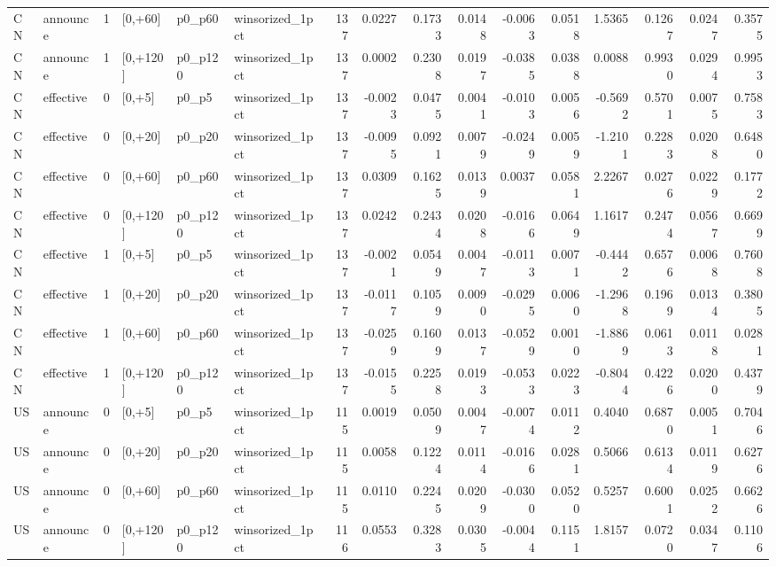 \begin{tabular}{llrlllrrrrrrrrrr}
CN & announce & 1 & [0,+60] & p0_p60 & winsorized_1pct & 137 & 0.0227 & 0.1733 & 0.0148 & -0.0063 & 0.0518 & 1.5365 & 0.1267 & 0.0247 & 0.3575 \\
CN & announce & 1 & [0,+120] & p0_p120 & winsorized_1pct & 137 & 0.0002 & 0.2308 & 0.0197 & -0.0385 & 0.0388 & 0.0088 & 0.9930 & 0.0294 & 0.9953 \\
CN & effective & 0 & [0,+5] & p0_p5 & winsorized_1pct & 137 & -0.0023 & 0.0475 & 0.0041 & -0.0103 & 0.0056 & -0.5692 & 0.5701 & 0.0075 & 0.7583 \\
CN & effective & 0 & [0,+20] & p0_p20 & winsorized_1pct & 137 & -0.0095 & 0.0921 & 0.0079 & -0.0249 & 0.0059 & -1.2101 & 0.2283 & 0.0208 & 0.6480 \\
CN & effective & 0 & [0,+60] & p0_p60 & winsorized_1pct & 137 & 0.0309 & 0.1625 & 0.0139 & 0.0037 & 0.0581 & 2.2267 & 0.0276 & 0.0229 & 0.1772 \\
CN & effective & 0 & [0,+120] & p0_p120 & winsorized_1pct & 137 & 0.0242 & 0.2434 & 0.0208 & -0.0166 & 0.0649 & 1.1617 & 0.2474 & 0.0567 & 0.6699 \\
CN & effective & 1 & [0,+5] & p0_p5 & winsorized_1pct & 137 & -0.0021 & 0.0549 & 0.0047 & -0.0113 & 0.0071 & -0.4442 & 0.6576 & 0.0068 & 0.7608 \\
CN & effective & 1 & [0,+20] & p0_p20 & winsorized_1pct & 137 & -0.0117 & 0.1059 & 0.0090 & -0.0295 & 0.0060 & -1.2968 & 0.1969 & 0.0134 & 0.3805 \\
CN & effective & 1 & [0,+60] & p0_p60 & winsorized_1pct & 137 & -0.0259 & 0.1609 & 0.0137 & -0.0529 & 0.0010 & -1.8869 & 0.0613 & 0.0118 & 0.0281 \\
CN & effective & 1 & [0,+120] & p0_p120 & winsorized_1pct & 137 & -0.0155 & 0.2258 & 0.0193 & -0.0533 & 0.0223 & -0.8044 & 0.4226 & 0.0200 & 0.4379 \\
US & announce & 0 & [0,+5] & p0_p5 & winsorized_1pct & 115 & 0.0019 & 0.0509 & 0.0047 & -0.0074 & 0.0112 & 0.4040 & 0.6870 & 0.0051 & 0.7046 \\
US & announce & 0 & [0,+20] & p0_p20 & winsorized_1pct & 115 & 0.0058 & 0.1224 & 0.0114 & -0.0166 & 0.0281 & 0.5066 & 0.6134 & 0.0119 & 0.6276 \\
US & announce & 0 & [0,+60] & p0_p60 & winsorized_1pct & 115 & 0.0110 & 0.2245 & 0.0209 & -0.0300 & 0.0520 & 0.5257 & 0.6001 & 0.0252 & 0.6626 \\
US & announce & 0 & [0,+120] & p0_p120 & winsorized_1pct & 116 & 0.0553 & 0.3283 & 0.0305 & -0.0044 & 0.1151 & 1.8157 & 0.0720 & 0.0347 & 0.1106 \\

\end{tabular}
